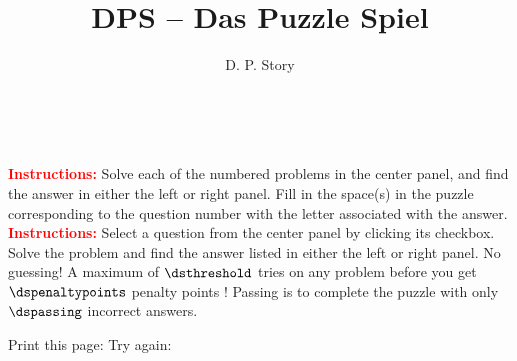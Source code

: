 \documentclass{article}
\title{DPS -- Das Puzzle Spiel}
\author{D. P. Story}
\begin{document}
\begin{center}\bfseries\Large\color{blue}
    \webtitle\\[1ex]\webauthor
\end{center}

\ifeqforpaper
    \textcolor{red}{\textbf{Instructions:}} Solve each of the
    numbered problems in the center panel, and find the answer in either
    the left or right panel.  Fill in the space(s) in the puzzle
    corresponding to the question number with the letter associated with
    the answer.
\else
    \textcolor{red}{\textbf{Instructions:}} Select a question from the
    center panel by clicking its checkbox. Solve the problem and find
    the answer listed in either the left or right panel.  No guessing!
    A maximum of $\dsthreshold$ tries on any problem before you get
    $\dspenaltypoints$ penalty points !  Passing is to complete the puzzle with only
    $\dspassing$ incorrect answers.
\fi

%
%

\placeMessageField{\linewidth}{50pt}


Print this page: \printDPS{}{11bp}\ifeqforpaper\else\cgBdry[1ex]
Try again: \resetDPS{}{11bp}\fi
\end{document}
